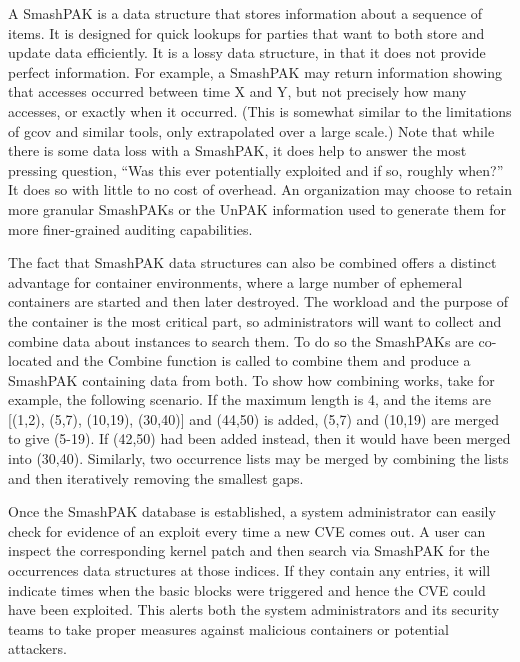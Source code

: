 A SmashPAK is a data structure that stores information about a sequence of items.  It is designed for quick lookups for parties that want to both store and update data efficiently.  
It is a lossy data structure, in that it does not provide perfect information.  For example, a SmashPAK may return information showing that accesses occurred between time X and Y, 
but not precisely how many accesses, or exactly when it occurred.  (This is somewhat similar to the limitations of gcov and similar tools, only extrapolated over a large scale.) 
Note that while there is some data loss with a SmashPAK, it does help to answer the most pressing question, ``Was this ever potentially exploited and if so, roughly when?''  
It does so with little to no cost of overhead.  An organization may choose to retain more granular SmashPAKs or the UnPAK information used to generate them for more finer-grained auditing capabilities.

The fact that SmashPAK data structures can also be combined offers a distinct advantage for container environments, where a large number of ephemeral containers are started and then later destroyed.  
The workload and the purpose of the container is the most critical part, so administrators will want to collect and combine data about instances to search them.  
To do so the SmashPAKs are co-located and the Combine function is called to combine them and produce a SmashPAK containing data from both. 
To show how combining works, take for example, the following scenario. If the maximum length is 4, and the items are [(1,2), (5,7), (10,19), (30,40)] and (44,50) is added, (5,7) and (10,19) are merged 
to give (5-19).  If (42,50) had been added instead, then it would have been merged into (30,40). 
Similarly, two occurrence lists may be merged by combining the lists and then iteratively removing the smallest gaps.    

Once the SmashPAK database is established, a system administrator can easily check for evidence of an exploit every time a new CVE comes out.  
A user can inspect the corresponding kernel patch and then search via SmashPAK for the occurrences data structures at those indices.  
If they contain any entries, it will indicate times when the basic blocks were triggered and hence the CVE could have been exploited. 
This alerts both the system administrators and its security teams to take proper measures against malicious containers or potential attackers. 